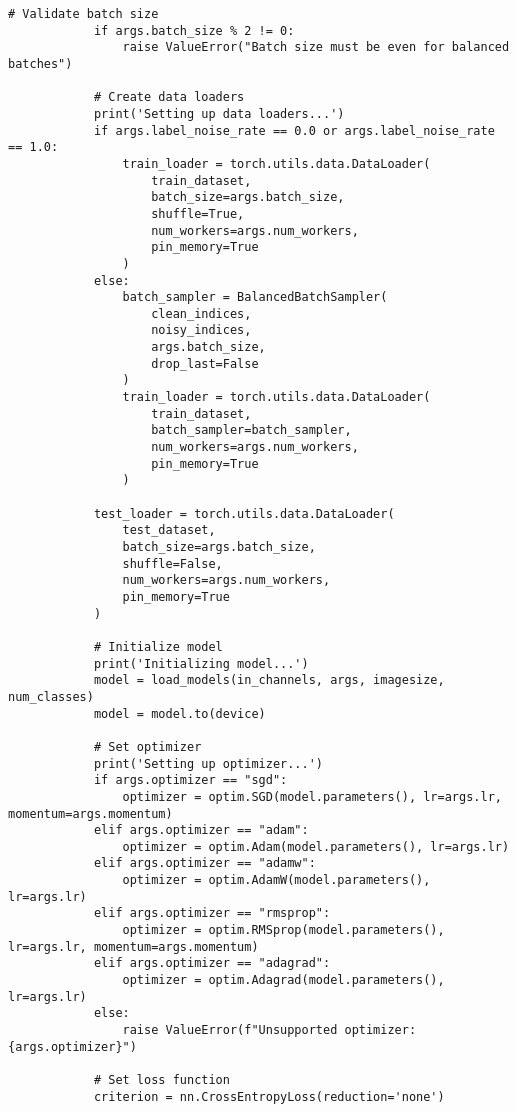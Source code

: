 \begin{lstlisting}[style=pythonstyle, caption={メインコード}]
            # Validate batch size
            if args.batch_size % 2 != 0:
                raise ValueError("Batch size must be even for balanced batches")
    
            # Create data loaders
            print('Setting up data loaders...')
            if args.label_noise_rate == 0.0 or args.label_noise_rate == 1.0:
                train_loader = torch.utils.data.DataLoader(
                    train_dataset,
                    batch_size=args.batch_size,
                    shuffle=True,
                    num_workers=args.num_workers,
                    pin_memory=True
                )
            else:
                batch_sampler = BalancedBatchSampler(
                    clean_indices,
                    noisy_indices,
                    args.batch_size,
                    drop_last=False
                )
                train_loader = torch.utils.data.DataLoader(
                    train_dataset,
                    batch_sampler=batch_sampler,
                    num_workers=args.num_workers,
                    pin_memory=True
                )
    
            test_loader = torch.utils.data.DataLoader(
                test_dataset,
                batch_size=args.batch_size,
                shuffle=False,
                num_workers=args.num_workers,
                pin_memory=True
            )
    
            # Initialize model
            print('Initializing model...')
            model = load_models(in_channels, args, imagesize, num_classes)
            model = model.to(device)
    
            # Set optimizer
            print('Setting up optimizer...')
            if args.optimizer == "sgd":
                optimizer = optim.SGD(model.parameters(), lr=args.lr, momentum=args.momentum)
            elif args.optimizer == "adam":
                optimizer = optim.Adam(model.parameters(), lr=args.lr)
            elif args.optimizer == "adamw":
                optimizer = optim.AdamW(model.parameters(), lr=args.lr)
            elif args.optimizer == "rmsprop":
                optimizer = optim.RMSprop(model.parameters(), lr=args.lr, momentum=args.momentum)
            elif args.optimizer == "adagrad":
                optimizer = optim.Adagrad(model.parameters(), lr=args.lr)
            else:
                raise ValueError(f"Unsupported optimizer: {args.optimizer}")
    
            # Set loss function
            criterion = nn.CrossEntropyLoss(reduction='none')
    

\end{lstlisting}
